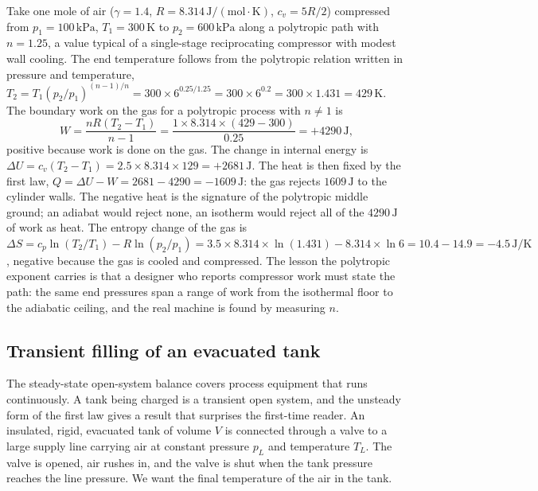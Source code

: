 Take one mole of air ($\gamma = 1.4$, $R = 8.314\,\text{J}/(\text{mol}
\cdot\si{\kelvin})$, $c_v = 5R/2$) compressed from $p_1 = 100\,\text{kPa}$,
$T_1 = 300\,\si{\kelvin}$ to $p_2 = 600\,\text{kPa}$ along a polytropic
path with $n = 1.25$, a value typical of a single-stage reciprocating
compressor with modest wall cooling. The end temperature follows from
the polytropic relation written in pressure and temperature,
$T_2 = T_1 (p_2/p_1)^{(n-1)/n} = 300 \times 6^{0.25/1.25} =
300 \times 6^{0.2} = 300 \times 1.431 = 429\,\si{\kelvin}$. The boundary
work on the gas for a polytropic process with $n \neq 1$ is
\[
W = \frac{nR(T_2 - T_1)}{n - 1}
  = \frac{1 \times 8.314 \times (429 - 300)}{0.25}
  = +4290\,\text{J},
\]
positive because work is done on the gas. The change in internal energy
is $\Delta U = c_v(T_2 - T_1) = 2.5 \times 8.314 \times 129 =
+2681\,\text{J}$. The heat is then fixed by the first law,
$Q = \Delta U - W = 2681 - 4290 = -1609\,\text{J}$: the gas rejects
$1609\,\text{J}$ to the cylinder walls. The negative heat is the
signature of the polytropic middle ground; an adiabat would reject none,
an isotherm would reject all of the $4290\,\text{J}$ of work as heat.
The entropy change of the gas is
$\Delta S = c_p \ln(T_2/T_1) - R \ln(p_2/p_1) =
3.5 \times 8.314 \times \ln(1.431) - 8.314 \times \ln 6 =
10.4 - 14.9 = -4.5\,\text{J}/\si{\kelvin}$, negative because the gas is
cooled and compressed. The lesson the polytropic exponent carries is
that a designer who reports compressor work must state the path: the
same end pressures span a range of work from the isothermal floor to the
adiabatic ceiling, and the real machine is found by measuring $n$.

\subsection{Transient filling of an evacuated tank}

The steady-state open-system balance covers process equipment that
runs continuously. A tank being charged is a transient open system, and
the unsteady form of the first law gives a result that surprises the
first-time reader. An insulated, rigid, evacuated tank of volume $V$ is
connected through a valve to a large supply line carrying air at
constant pressure $p_L$ and temperature $T_L$. The valve is opened, air
rushes in, and the valve is shut when the tank pressure reaches the line
pressure. We want the final temperature of the air in the tank.

